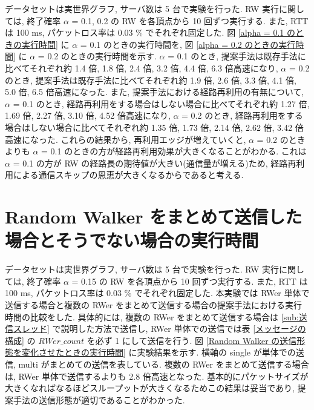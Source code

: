 データセットは実世界グラフ, サーバ数は 5 台で実験を行った. RW 実行に関しては, 終了確率 $\alpha$ = 0.1, 0.2 の RW を各頂点から 10 回ずつ実行する. また, RTT は 100 ms, パケットロス率は 0.03 \% でそれぞれ固定した. 図 \ref{alpha = 0.1 のときの実行時間} に $\alpha$ = 0.1 のときの実行時間を, 図 \ref{alpha = 0.2 のときの実行時間} に $\alpha$ = 0.2 のときの実行時間を示す. $\alpha$ = 0.1 のとき, 提案手法は既存手法に比べてそれぞれ約 1.4 倍, 1.8 倍, 2.4 倍, 3.2 倍, 4.4 倍, 6.3 倍高速になり, $\alpha$ = 0.2 のとき, 提案手法は既存手法に比べてそれぞれ約 1.9 倍, 2.6 倍, 3.3 倍, 4.1 倍, 5.0 倍, 6.5 倍高速になった. また, 提案手法における経路再利用の有無について, $\alpha$ = 0.1 のとき, 経路再利用をする場合はしない場合に比べてそれぞれ約 1.27 倍, 1.69 倍, 2.27 倍, 3.10 倍, 4.52 倍高速になり, $\alpha$ = 0.2 のとき, 経路再利用をする場合はしない場合に比べてそれぞれ約 1.35 倍, 1.73 倍, 2.14 倍, 2.62 倍, 3.42 倍高速になった. これらの結果から, 再利用エッジが増えていくと, $\alpha$ = 0.2 のときよりも $\alpha$ = 0.1 のときの方が経路再利用効果が大きくなることがわかる. これは $\alpha$ = 0.1 の方が RW の経路長の期待値が大きい(通信量が増える)ため, 経路再利用による通信スキップの恩恵が大きくなるからであると考える. 

\section{Random Walker をまとめて送信した場合とそうでない場合の実行時間}\label{Random Walker をまとめて送信した場合とそうでない場合の実行時間}

データセットは実世界グラフ, サーバ数は 5 台で実験を行った. RW 実行に関しては, 終了確率 $\alpha$ = 0.15 の RW を各頂点から 10 回ずつ実行する. また, RTT は 100 ms, パケットロス率は 0.03 \% でそれぞれ固定した. 本実験では RWer 単体で送信する場合と複数の RWer をまとめて送信する場合の提案手法における実行時間の比較をした. 具体的には, 複数の RWer をまとめて送信する場合は \ref{sub:送信スレッド} で説明した方法で送信し, RWer 単体での送信では表 \ref{メッセージの構成} の $RWer\_count$ を必ず 1 にして送信を行う. 図 \ref{Random Walker の送信形態を変化させたときの実行時間} に実験結果を示す. 横軸の single が単体での送信, multi がまとめての送信を表している. 複数の RWer をまとめて送信する場合は, RWer 単体で送信するよりも 2.8 倍高速となった. 基本的にパケットサイズが大きくなればなるほどスループットが大きくなるためこの結果は妥当であり, 提案手法の送信形態が適切であることがわかった. 

